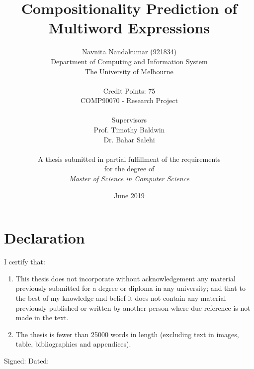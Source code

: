 \documentclass[12pt,a4paper]{report}
\begin{document}
\title{\textbf{Compositionality Prediction of Multiword Expressions}  \\ }
\author{\Large {Navnita Nandakumar (921834)} \\
\large Department of Computing and Information System \\
\large The University of Melbourne \\ \\
\Large {Credit Points: 75} \\ \Large {COMP90070 - Research Project} \\ \\
\Large{Supervisors} \\ \large Prof. Timothy Baldwin \\ Dr. Bahar Salehi \\ \\
A thesis submitted in partial fulfillment of the requirements \\ for the degree of \\ \textit{Master of Science in Computer Science}
}
\date{June 2019}

\maketitle
\chapter*{\centering \LARGE Declaration}
I certify that:
\begin{enumerate}
\item This thesis does not incorporate without acknowledgement any material previously submitted for a degree or diploma in any university; and that to the best of my knowledge and belief it does not contain any material previously published or written by another person where due reference is not made in the text.
\item The thesis is fewer than 25000 words in length (excluding text in images, table, bibliographies and appendices).
\end{enumerate}
\bigskip
\bigskip
Signed: \hrulefill Dated: \hrulefill
 
\end{document}
